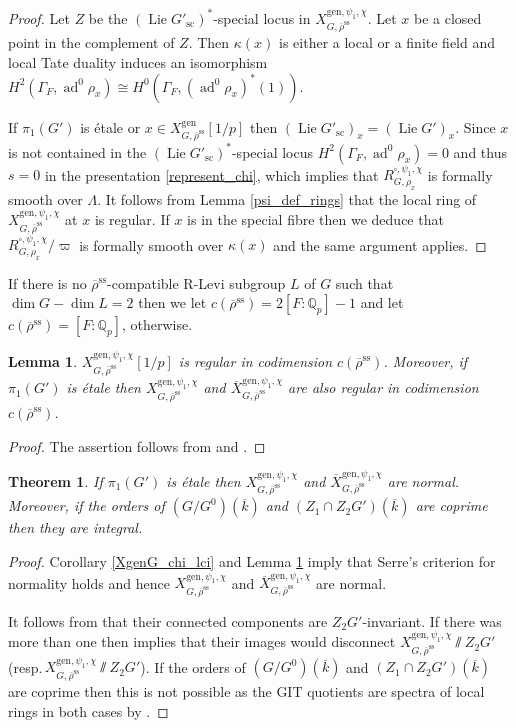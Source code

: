 \documentclass{amsart}
\newtheorem{lem}[prop]{Lemma}
\newtheorem{thm}[prop]{Theorem}
\theoremstyle{definition}
\theoremstyle{remark}
\newcommand{\Qp}{\mathbb {Q}_p}
\DeclareMathOperator{\ad}{ad}
\newcommand{\rhobar}{\overline{\rho}}
\newcommand{\gen}{\mathrm{gen}}
\newcommand{\Xbar}{\overline{X}}
\DeclareMathOperator{\Lie}{Lie}
\newcommand{\kbar}{\overline{k}}
\newcommand{\rhobarss}{\rhobar^{\mathrm{ss}}}
\newcommand{\sic}{\operatorname{sc}}
\begin{document}
\begin{proof}  Let $Z$ be the $(\Lie G'_{\sic})^*$-special locus in $X^{\gen,\psi_1, \chi}_{G, \rhobarss}$. Let $x$ be a closed point 
in the complement of $Z$.  Then
$\kappa(x)$ is either a local or a finite field and local Tate duality induces 
an isomorphism 
$ H^2(\Gamma_F, \ad^0 \rho_x)\cong H^0(\Gamma_F, (\ad^0 \rho_x)^*(1)).$

If  $\pi_1(G')$ is \'etale or $x\in X^{\gen}_{G, \rhobarss}[1/p]$ then $(\Lie G'_{\sic})_x=(\Lie G')_x$. Since $x$ is not contained in the $(\Lie G'_{\sic})^*$-special locus $H^2(\Gamma_F, \ad^0 \rho_x)=0$ and thus $s=0$ in the presentation \eqref{represent_chi}, which implies 
that $R^{\square,\psi_1, \chi}_{G, \rho_x}$ is formally smooth over $\Lambda$. It follows from Lemma \ref{psi_def_rings} that the local 
ring of $X^{\gen,\psi_1, \chi}_{G, \rhobarss}$ at $x$ is regular. If $x$ is in the special fibre then we deduce
that $R^{\square,\psi_1, \chi}_{G, \rho_x}/\varpi$ is formally smooth over $\kappa(x)$ and the same argument applies. 
\end{proof} 
If  there is no $\rhobarss$-compatible R-Levi subgroup $L$ of $G$ such that $\dim G -\dim L=2$ then we let $c(\rhobarss)=2[F:\Qp]-1$ and let $c(\rhobarss)=[F:\Qp]$, otherwise. 
\begin{lem}\label{R1_chi} $X^{\gen,\psi_1,\chi}_{G,\rhobarss}[1/p]$ is regular in codimension $c(\rhobarss)$. Moreover,  if $\pi_1(G')$ is \'etale then $X^{\gen,\psi_1, \chi}_{G, \rhobarss}$ and $\Xbar^{\gen, \psi_1, \chi}_{G, \rhobarss}$ are  also regular in codimension $c(\rhobarss)$.
\end{lem}
\begin{proof} The assertion follows from  and .
\end{proof}

\begin{thm}\label{chi_nor_int} If $\pi_1(G')$ is \'etale then $X^{\gen, \psi_1, \chi}_{G, \rhobarss}$ 
and $\Xbar^{\gen, \psi_1, \chi}_{G, \rhobarss}$ are normal.  
Moreover, if the orders of $(G/G^0)(\kbar)$ and $(Z_1\cap Z_2G')(\kbar)$ are coprime then they are integral.
\end{thm}
\begin{proof} Corollary  \ref{XgenG_chi_lci} and Lemma \ref{R1_chi} imply that Serre's criterion for normality holds and
hence $X^{\gen, \psi_1, \chi}_{G, \rhobarss}$ and $\Xbar^{\gen, \psi_1, \chi}_{G, \rhobarss}$ are normal. 

It follows from \cite[Lemma 2.1]{BIP_new} 
that their connected components are $Z_2G'$-invariant. If there was more than one then \cite[Theorem 3 (iii)]{seshadri} implies that their images would disconnect
$X^{\gen, \psi_1, \chi}_{G, \rhobarss}\sslash Z_2 G'$
(resp.\,$X^{\gen, \psi_1, \chi}_{G, \rhobarss}\sslash Z_2 G'$). 
If the orders of $(G/G^0)(\kbar)$ and $(Z_1\cap Z_2G')(\kbar)$ are coprime
then this is not possible as the GIT quotients are spectra of local rings in both cases by .
\end{proof}
\end{document}
